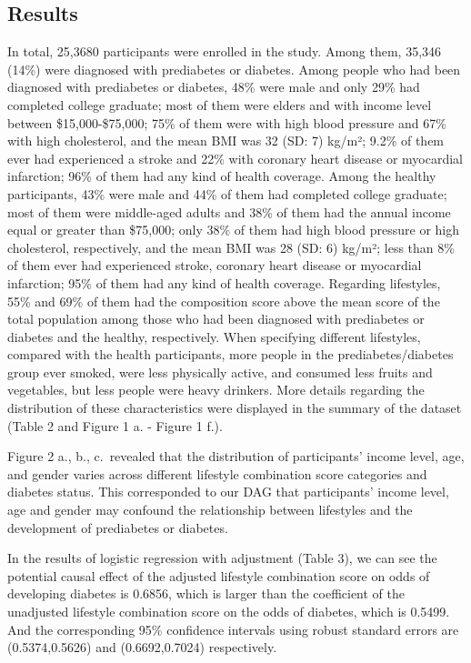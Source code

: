 \documentclass[
  12pt,
]{article}
\begin{document}
\hypertarget{results}{%
\subsection{Results}\label{results}}

In total, 25,3680 participants were enrolled in the study. Among them,
35,346 (14\%) were diagnosed with prediabetes or diabetes. Among people
who had been diagnosed with prediabetes or diabetes, 48\% were male and
only 29\% had completed college graduate; most of them were elders and
with income level between \$15,000-\$75,000; 75\% of them were with high
blood pressure and 67\% with high cholesterol, and the mean BMI was 32
(SD: 7) kg/m²; 9.2\% of them ever had experienced a stroke and 22\% with
coronary heart disease or myocardial infarction; 96\% of them had any
kind of health coverage. Among the healthy participants, 43\% were male
and 44\% of them had completed college graduate; most of them were
middle-aged adults and 38\% of them had the annual income equal or
greater than \$75,000; only 38\% of them had high blood pressure or high
cholesterol, respectively, and the mean BMI was 28 (SD: 6) kg/m²; less
than 8\% of them ever had experienced stroke, coronary heart disease or
myocardial infarction; 95\% of them had any kind of health coverage.
Regarding lifestyles, 55\% and 69\% of them had the composition score
above the mean score of the total population among those who had been
diagnosed with prediabetes or diabetes and the healthy, respectively.
When specifying different lifestyles, compared with the health
participants, more people in the prediabetes/diabetes group ever smoked,
were less physically active, and consumed less fruits and vegetables,
but less people were heavy drinkers. More details regarding the
distribution of these characteristics were displayed in the summary of
the dataset (Table 2 and Figure 1 a. - Figure 1 f.).

Figure 2 a., b., c.~revealed that the distribution of participants'
income level, age, and gender varies across different lifestyle
combination score categories and diabetes status. This corresponded to
our DAG that participants' income level, age and gender may confound the
relationship between lifestyles and the development of prediabetes or
diabetes.

In the results of logistic regression with adjustment (Table 3), we can
see the potential causal effect of the adjusted lifestyle combination
score on odds of developing diabetes is 0.6856, which is larger than the
coefficient of the unadjusted lifestyle combination score on the odds of
diabetes, which is 0.5499. And the corresponding 95\% confidence
intervals using robust standard errors are (0.5374,0.5626) and
(0.6692,0.7024) respectively.
\end{document}
